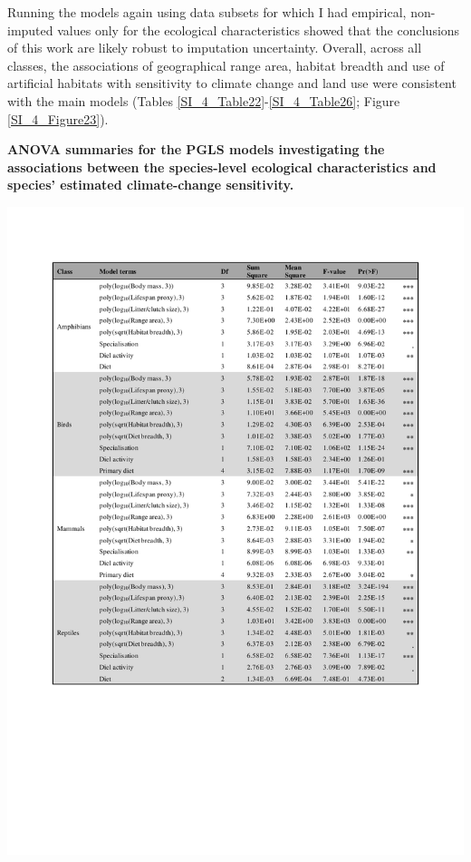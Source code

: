 Running the models again using data subsets for which I had empirical, non-imputed values only for the ecological characteristics showed that the conclusions of this work are likely robust to imputation uncertainty. Overall, across all classes, the associations of geographical range area, habitat breadth and use of artificial habitats with sensitivity to climate change and land use were consistent with the main models (Tables \ref{SI_4_Table22}-\ref{SI_4_Table26}; Figure \ref{SI_4_Figure23}).


\clearpage


\begin{table}[h!]
\centering
\caption[ANOVA summaries for the PGLS models investigating the associations between the species-level ecological characteristics and species' estimated climate-change sensitivity.]{\textbf{ANOVA summaries for the PGLS models investigating the associations between the species-level ecological characteristics and species' estimated climate-change sensitivity.}}
\includegraphics[scale=1, trim={2cm 5 1 2cm}, clip]{figures/Chapter4/Table_ANOVA_PGLS_pdf}
\label{chap4_table2}
\end{table}



